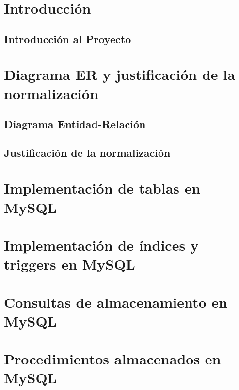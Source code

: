 \documentclass[12pt]{article}
\begin{document}


\tableofcontents
\newpage

\section{Introducción}
\subsection{Introducción al Proyecto}


\section{Diagrama ER y justificación de la normalización}
\subsection{Diagrama Entidad-Relación}


\subsection{Justificación de la normalización}


\section{Implementación de tablas en MySQL}



\section{Implementación de índices y triggers en MySQL}


\section{Consultas de almacenamiento en MySQL}


\section{Procedimientos almacenados en MySQL}

\end{document}
